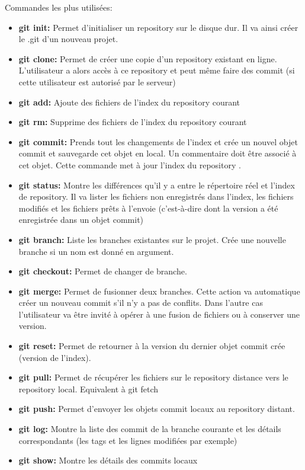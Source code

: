 \noindent Commandes les plus utilisées:
\begin{itemize}
\item \textbf{git init:} Permet d’initialiser un repository sur le disque dur. Il va ainsi créer le .git d’un nouveau projet.
\item \textbf{git clone:} Permet de créer une copie d’un repository existant en ligne. L’utilisateur a alors accès à ce repository et peut même faire des commit (si cette utilisateur est autorisé par le serveur)
\item \textbf{git add:} Ajoute des fichiers de l’index du repository courant
\item \textbf{git rm:} Supprime des fichiers de l’index du repository courant
\item \textbf{git commit:} Prends tout les changements de l’index et crée un nouvel objet commit et sauvegarde cet objet en local. Un commentaire doit être associé à cet objet. Cette commande met à jour l’index du repository .
\item \textbf{git status:} Montre les différences qu’il y a entre le répertoire réel et l’index de repository. Il va lister les fichiers non enregistrés dans l’index, les fichiers modifiés et les fichiers prêts à l’envoie (c’est-à-dire dont la version a été enregistrée dans un objet commit)
\item \textbf{git branch:} Liste les branches existantes sur le projet. Crée une nouvelle branche si un nom est donné en argument.
\item \textbf{git checkout:} Permet de changer de branche.
\item \textbf{git merge:} Permet de fusionner deux branches. Cette action va automatique créer un nouveau commit s’il n’y a pas de conflits. Dans l’autre cas l’utilisateur va être invité à opérer à une fusion de fichiers ou à conserver une version.
\item \textbf{git reset:} Permet de retourner à la version du dernier objet commit crée (version de l’index).
\item \textbf{git pull:} Permet de récupérer les fichiers sur le repository distance vers le repository local. Equivalent à git fetch
\item \textbf{git push:} Permet d’envoyer les objets commit locaux au repository distant.
\item \textbf{git log:} Montre la liste des commit de la branche courante et les détails correspondants (les tags et les lignes modifiées par exemple)
\item \textbf{git show:} Montre les détails des commits locaux
\end{itemize}
